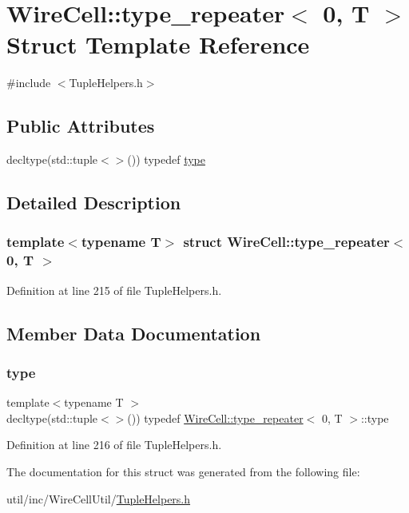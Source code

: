 \hypertarget{struct_wire_cell_1_1type__repeater_3_010_00_01_t_01_4}{}\section{Wire\+Cell\+:\+:type\+\_\+repeater$<$ 0, T $>$ Struct Template Reference}
\label{struct_wire_cell_1_1type__repeater_3_010_00_01_t_01_4}


{\ttfamily \#include $<$Tuple\+Helpers.\+h$>$}

\subsection*{Public Attributes}
\begin{DoxyCompactItemize}
\item 
decltype(std\+::tuple$<$$>$()) typedef \hyperlink{struct_wire_cell_1_1type__repeater_3_010_00_01_t_01_4_a8fdb494e7c894a060cb352ae07766060}{type}
\end{DoxyCompactItemize}


\subsection{Detailed Description}
\subsubsection*{template$<$typename T$>$\newline
struct Wire\+Cell\+::type\+\_\+repeater$<$ 0, T $>$}



Definition at line 215 of file Tuple\+Helpers.\+h.



\subsection{Member Data Documentation}
\mbox{\label{struct_wire_cell_1_1type__repeater_3_010_00_01_t_01_4_a8fdb494e7c894a060cb352ae07766060}} 
\subsubsection{\texorpdfstring{type}{type}}
{\footnotesize\ttfamily template$<$typename T $>$ \\
decltype(std\+::tuple$<$$>$()) typedef \hyperlink{struct_wire_cell_1_1type__repeater}{Wire\+Cell\+::type\+\_\+repeater}$<$ 0, T $>$\+::type}



Definition at line 216 of file Tuple\+Helpers.\+h.



The documentation for this struct was generated from the following file\+:\begin{DoxyCompactItemize}
\item 
util/inc/\+Wire\+Cell\+Util/\hyperlink{_tuple_helpers_8h}{Tuple\+Helpers.\+h}\end{DoxyCompactItemize}
